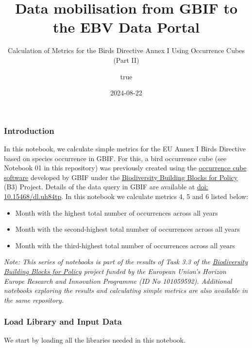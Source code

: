 \documentclass[
]{article}
\title{ Data mobilisation from GBIF to the EBV Data Portal}
\subtitle{ Calculation of Metrics for the Birds Directive Annex I Using
Occurrence Cubes (Part II)}
\author{true}
\date{2024-08-22}
\providecommand{\tightlist}{%
  \setlength{\itemsep}{0pt}\setlength{\parskip}{0pt}}
\begin{document}
\maketitle

\subsection{}\label{section}

\subsubsection{Introduction}\label{introduction}

In this notebook, we calculate simple metrics for the EU Annex I Birds
Directive based on species occurrence in GBIF. For this, a bird
occurrence cube (see Notebook 01 in this repository) was previously
created using the
\href{https://techdocs.gbif.org/en/data-use/data-cubes}{occurrence cube
software} developed by GBIF under the
\href{https://b-cubed.eu/}{Biodiversity Building Blocks for Policy} (B3)
Project. Details of the data query in GBIF are available at
\href{https://doi.org/10.15468/dl.uh84tp/}{doi: 10.15468/dl.uh84tp}. In
this notebook we calculate metrics 4, 5 and 6 listed below:

\begin{itemize}
\tightlist
\item
  Month with the highest total number of occurrences across all years
\item
  Month with the second-highest total number of occurrences across all
  years
\item
  Month with the third-highest total number of occurrences across all
  years
\end{itemize}

\emph{Note: This series of notebooks is part of the results of Task 3.3
of the \href{https://b-cubed.eu/}{Biodiversity Building Blocks for
Policy} project funded by the European Union's Horizon Europe Research
and Innovation Programme (ID No 101059592). Additional notebooks
exploring the results and calculating simple metrics are also available
in the same repository.}

\subsubsection{Load Library and Input
Data}\label{load-library-and-input-data}

We start by loading all the libraries needed in this notebook.
\end{document}
